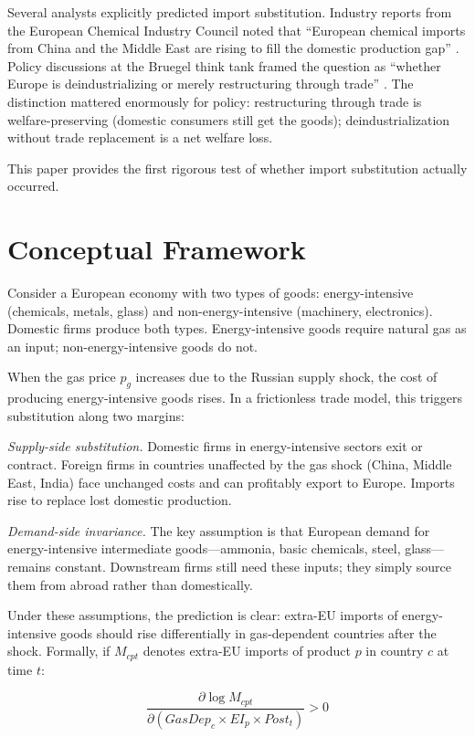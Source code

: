 \documentclass[12pt]{article}
\begin{document}
Several analysts explicitly predicted import substitution. Industry reports from the European Chemical Industry Council noted that ``European chemical imports from China and the Middle East are rising to fill the domestic production gap'' \citep{cefic2023}. Policy discussions at the Bruegel think tank framed the question as ``whether Europe is deindustrializing or merely restructuring through trade'' \citep{pisaniferry2022}. The distinction mattered enormously for policy: restructuring through trade is welfare-preserving (domestic consumers still get the goods); deindustrialization without trade replacement is a net welfare loss.

This paper provides the first rigorous test of whether import substitution actually occurred.


\section{Conceptual Framework}
\label{sec:framework}

Consider a European economy with two types of goods: energy-intensive (chemicals, metals, glass) and non-energy-intensive (machinery, electronics). Domestic firms produce both types. Energy-intensive goods require natural gas as an input; non-energy-intensive goods do not.

When the gas price $p_g$ increases due to the Russian supply shock, the cost of producing energy-intensive goods rises. In a frictionless trade model, this triggers substitution along two margins:

\textit{Supply-side substitution.} Domestic firms in energy-intensive sectors exit or contract. Foreign firms in countries unaffected by the gas shock (China, Middle East, India) face unchanged costs and can profitably export to Europe. Imports rise to replace lost domestic production.

\textit{Demand-side invariance.} The key assumption is that European demand for energy-intensive intermediate goods---ammonia, basic chemicals, steel, glass---remains constant. Downstream firms still need these inputs; they simply source them from abroad rather than domestically.

Under these assumptions, the prediction is clear: extra-EU imports of energy-intensive goods should rise differentially in gas-dependent countries after the shock. Formally, if $M_{cpt}$ denotes extra-EU imports of product $p$ in country $c$ at time $t$:

\begin{equation}
\frac{\partial \log M_{cpt}}{\partial (GasDep_c \times EI_p \times Post_t)} > 0
\label{eq:prediction}
\end{equation}
\end{document}
